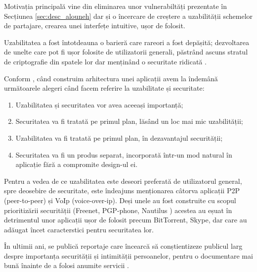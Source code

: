 \documentclass[oneside, 12pt]{book}
\begin{document}
Motivația principală vine din eliminarea unor vulnerabiltăți prezentate în Secțiunea  \ref{sec:desc_alouneh} dar și o încercare de creștere a uzabilității schemelor de partajare, crearea unei interfețe intuitive, ușor de folosit.

Uzabilitatea a fost întotdeauna o barieră care rareori a fost depășită; dezvoltarea de unelte care pot fi ușor folosite de utilizatorii generali, păstrând ascuns stratul de criptografie din spatele lor dar menținând o securitate ridicată \cite{gutmann:2005security}.

Conform \cite{gutmann:2005security}, când construim arhitectura unei aplicații avem la îndemână următoarele alegeri când facem referire la uzabilitate și securitate:

\begin{enumerate}
\item Uzabilitatea și securitatea vor avea aceeași importanță; 
\item Securitatea va fi tratată pe primul plan, lăsând un loc mai mic uzabilității;
\item Uzabilitatea va fi tratată pe primul plan, în dezavantajul securității;
\item Securitatea va fi un produs separat, incorporată într-un mod natural în aplicație fără a compromite design-ul ei.
\end{enumerate}

Pentru a vedea de ce uzabilitatea este deseori preferată de utilizatorul general, spre deosebire de securitate, este îndeajuns menționarea câtorva aplicații P2P (peer-to-peer) și VoIp (voice-over-ip). Deși unele au fost construite cu scopul prioritizării securității (Freenet, PGP-phone, Nautilus \cite{website:freenet, website:pgp-phone, website:nautilus}) acestea au eșuat în detrimentul unor aplicații ușor de folosit precum BitTorrent, Skype, dar care au adăugat încet caracterstici pentru securitatea lor.

În ultimii ani, se publică reportaje care încearcă să conștientizeze publicul larg despre importanța securității și intimității persoanelor, pentru o documentare mai bună înainte de a folosi anumite servicii \cite{greenwald:2013nsa, greenwald:2013edward}.
\end{document}
